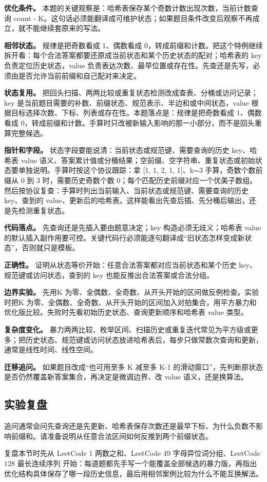 \textbf{优化条件。} 本题的关键观察是：哈希表保存某个奇数计数出现次数，当前计数查询 count - K。这句话必须能翻译成可维护状态；如果题目条件改变后观察不再成立，就不能继续套原来的写法。

\textbf{相邻状态。} 规律是把奇数看成 1、偶数看成 0，转成前缀和计数。把这个特例继续拆开看：每个合法答案都要还原成当前状态和某个历史状态的配对；哈希表的 key 负责定位历史状态，value 负责表达次数、最早位置或存在性。先查还是先写，必须由是否允许当前前缀和自己配对来决定。

\textbf{状态复用。} 把回头扫描、两两比较或重复状态检测改成查表、分桶或访问记录；key 是当前题目需要的补数、前缀状态、规范表示、半边和或中间状态，value 根据目标选择次数、下标、列表或存在性。本题落点是：规律是把奇数看成 1、偶数看成 0，转成前缀和计数。手算时只改被新输入影响的那一小部分，而不是回头重算完整候选。

\textbf{指针和字段。} 状态字段要能说清：当前状态或规范键、需要查询的历史 key、哈希表 value 语义、答案累计值或分桶结果；空前缀、空字符串、重复状态或初始状态要单独说明。手算时按这个协议跟踪：拿 [1, 1, 2, 1, 1]、k=3 手算，奇数个数前缀从 0 到 3 时，需要历史奇数个数 0；每个匹配历史前缀对应一个优美子数组。然后按协议复查：手算时列出当前输入、当前状态或规范键、需要查询的历史 key、查到的 value、更新后的哈希表。这样能看出先查后插、先分桶后输出，还是先检测重复状态。

\textbf{代码落点。} 先查询还是先插入要由题意决定；key 构造必须无歧义；哈希表 value 的默认插入副作用要可控。关键代码行必须能逐句翻译成“旧状态怎样变成新状态”，否则就只是模板。

\textbf{正确性。} 证明从状态等价开始：任意合法答案都对应当前状态和某个历史 key、规范键或访问状态，查到的 key 也能反推出合法答案或合法分组。

\textbf{边界实验。} 先用K 为零、全偶数、全奇数、从开头开始的区间做反例检查。实验时把K 为零、全偶数、全奇数、从开头开始的区间加入对拍集合，用平方暴力和优化版比较。失败时先看初始历史状态、查询更新顺序和哈希表 value 类型。

\textbf{复杂度变化。} 暴力两两比较、枚举区间、扫描历史或重复迭代常见为平方级或更多；把历史状态、规范键或访问状态放进哈希表后，每步只做常数次查询和更新，通常是线性时间、线性空间。

\textbf{迁移追问。} 如果题目改成“也可用至多 K 减至多 K-1 的滑动窗口”，先判断原状态是否仍然覆盖新答案集合，再决定是微调边界、改 value 语义，还是换算法。

\subsection{实验复盘}

追问通常会问先查询还是先更新、哈希表保存次数还是最早下标、为什么负数不影响前缀和。请准备说明从任意合法区间如何反推到两个前缀状态。

复盘本节时先从 LeetCode 1 两数之和、LeetCode 49 字母异位词分组、LeetCode 128 最长连续序列 开始：每道题都先手写一个能覆盖全部候选的暴力版，再指出优化结构具体保存了哪一段历史信息，最后用相邻案例比较为什么不能互换解法。
